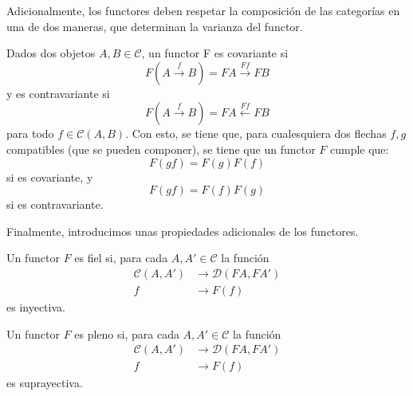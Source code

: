 Adicionalmente, los functores deben respetar la composición de las categorías en una de dos maneras, que determinan la varianza del functor.
\begin{definition}
    Dados dos objetos $A,B\in\mathcal{C}$, un functor F es covariante si
    \begin{equation*}
        F(A\overset{f}{\to}B)=FA\overset{Ff}{\to}FB
    \end{equation*}
    y es contravariante si
    \begin{equation*}
        F(A\overset{f}{\to}B)=FA\overset{Ff}{\leftarrow}FB
    \end{equation*}
    para todo $f\in\mathcal{C}(A,B)$.
    Con esto, se tiene que, para cualesquiera dos flechas $f,g$ compatibles (que se pueden componer), se tiene que un functor $F$ cumple que:
    \begin{equation*}
        F(gf)=F(g)F(f)
    \end{equation*}
    si es covariante, y 
    \begin{equation*}
        F(gf)=F(f)F(g)
    \end{equation*}
    si es contravariante.
\end{definition}
Finalmente, introducimos unas propiedades adicionales de los functores.
\begin{definition}[Fidelidad]
    Un functor $F$ es fiel si, para cada $A,A'\in\mathcal{C}$ la función 
    \begin{align*}
        \mathcal{C}(A,A') & \to \mathcal{D}(FA,FA')\\
        f & \to F(f)
    \end{align*}
    es inyectiva.
\end{definition}
\begin{definition}[Plenitud]
    Un functor $F$ es pleno si, para cada $A,A'\in\mathcal{C}$ la función 
    \begin{align*}
        \mathcal{C}(A,A') & \to \mathcal{D}(FA,FA')\\
        f & \to F(f)
    \end{align*}
    es suprayectiva.
\end{definition}


